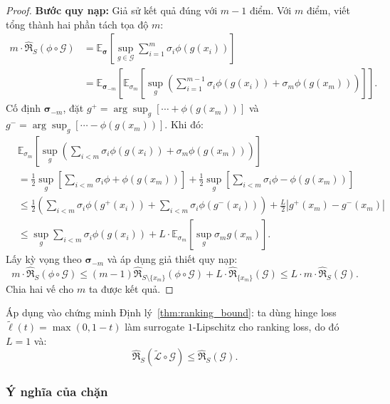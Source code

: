 \begin{morong}
\begin{proof}
\textbf{Bước quy nạp:}
Giả sử kết quả đúng với $m-1$ điểm. Với $m$ điểm, 
viết tổng thành hai phần tách tọa độ $m$:
\begin{align*}
  m\cdot\hat{\mathfrak{R}}_S(\phi \circ \mathcal{G})
  &= \mathbb{E}_{\boldsymbol{\sigma}}\left[
      \sup_{g \in \mathcal{G}} \sum_{i=1}^{m} 
      \sigma_i \phi(g(x_i))\right] \\
  &= \mathbb{E}_{\boldsymbol{\sigma}_{-m}}\left[
      \mathbb{E}_{\sigma_m}\left[
        \sup_g \left(
          \sum_{i=1}^{m-1}\sigma_i\phi(g(x_i)) 
          + \sigma_m\phi(g(x_m))
        \right)
      \right]
    \right].
\end{align*}
Cố định $\boldsymbol{\sigma}_{-m}$, đặt 
$g^+ = \arg\sup_g [\cdots + \phi(g(x_m))]$ và 
$g^- = \arg\sup_g [\cdots - \phi(g(x_m))]$. Khi đó:
\begin{align*}
  &\mathbb{E}_{\sigma_m}\left[\sup_g \left(
    \sum_{i<m}\sigma_i\phi(g(x_i)) + \sigma_m\phi(g(x_m))
  \right)\right] \\
  &= \frac{1}{2}\sup_g\!\left[\sum_{i<m}\!\sigma_i\phi 
     + \phi(g(x_m))\right]
   + \frac{1}{2}\sup_g\!\left[\sum_{i<m}\!\sigma_i\phi 
     - \phi(g(x_m))\right] \\
  &\leq \frac{1}{2}\!\left(
      \sum_{i<m}\sigma_i\phi(g^+(x_i)) 
    + \sum_{i<m}\sigma_i\phi(g^-(x_i))
    \right)
    + \frac{L}{2}|g^+(x_m) - g^-(x_m)| \\
  &\leq \sup_g \sum_{i<m}\sigma_i\phi(g(x_i))
    + L\cdot\mathbb{E}_{\sigma_m}\!\left[
        \sup_g \sigma_m g(x_m)\right].
\end{align*}
Lấy kỳ vọng theo $\boldsymbol{\sigma}_{-m}$ và áp dụng 
giả thiết quy nạp:
\[
  m\cdot\hat{\mathfrak{R}}_S(\phi\circ\mathcal{G})
  \leq (m-1)\hat{\mathfrak{R}}_{S\setminus\{x_m\}}
        (\phi\circ\mathcal{G})
    + L\cdot\hat{\mathfrak{R}}_{\{x_m\}}(\mathcal{G})
  \leq L\cdot m\cdot\hat{\mathfrak{R}}_S(\mathcal{G}).
\]
Chia hai vế cho $m$ ta được kết quả.
\end{proof}

Áp dụng vào chứng minh Định lý~\ref{thm:ranking_bound}: 
ta dùng hinge loss $\tilde{\ell}(t) = \max(0, 1-t)$ 
làm surrogate $1$-Lipschitz cho ranking loss, do đó 
$L = 1$ và:
\[
  \hat{\mathfrak{R}}_S(\tilde{\mathcal{L}} \circ \mathcal{G}) 
  \leq \hat{\mathfrak{R}}_S(\mathcal{G}).
\]
\end{morong}

\subsubsection{Ý nghĩa của chặn}

